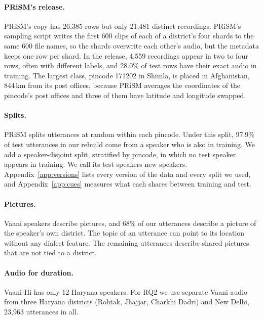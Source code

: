 \documentclass[11pt]{article}
\begin{document}
\paragraph{PRiSM's release.} PRiSM's copy has 26,385 rows but only 21,481 distinct recordings. PRiSM's sampling
script writes the first 600 clips of each of a district's four shards to the same 600 file names, so the shards
overwrite each other's audio, but the metadata keeps one row per shard. In the release, 4,559 recordings appear in
two to four rows, often with different labels, and 28.0\% of test rows have their exact audio in training. The
largest class, pincode 171202 in Shimla, is placed in Afghanistan, 844\,km from its post offices, because PRiSM
averages the coordinates of the pincode's post offices and three of them have latitude and longitude swapped.

\paragraph{Splits.} PRiSM splits utterances at random within each pincode. Under this split, 97.9\% of test
utterances in our rebuild come from a speaker who is also in training. We add a speaker-disjoint split,
stratified by pincode, in which no test speaker appears in training. We call its test speakers new speakers.
Appendix~\ref{app:versions} lists every version of the data and every split we used, and
Appendix~\ref{app:cues} measures what each shares between training and test.

\paragraph{Pictures.} Vaani speakers describe pictures, and 68\% of our utterances describe a picture of the
speaker's own district. The topic of an utterance can point to its location without any dialect
feature. The remaining utterances describe shared pictures that are not tied to a district.

\paragraph{Audio for duration.} Vaani-Hi has only 12 Haryana speakers. For RQ2 we use separate Vaani audio from
three Haryana districts (Rohtak, Jhajjar, Charkhi Dadri) and New Delhi, 23,963 utterances in all.

\begin{table}[t]
\centering\footnotesize

\caption{The two versions of Vaani-Hi. PRiSM's release has no speaker labels; its speaker overlap is estimated
from voice embeddings calibrated on our rebuild.}
\label{tab:data}
\end{table}
\end{document}
